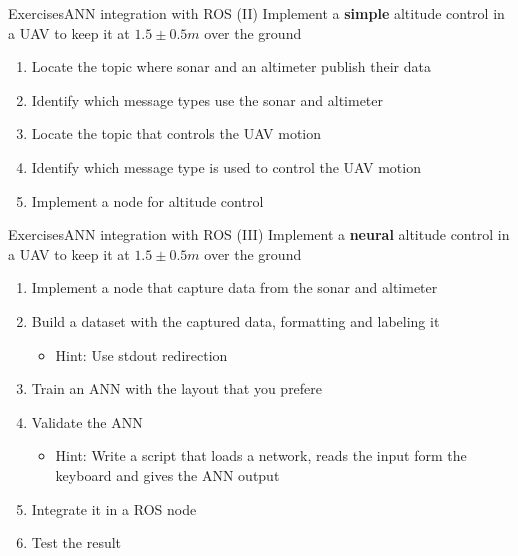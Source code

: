 \documentclass[10pt,compress]{beamer} %
\begin{document}
\begin{frame}{Exercises}{ANN integration with ROS (II)}
	Implement a \textbf{simple} altitude control in a UAV to keep it at $1.5\pm0.5 m$ over the ground
	\begin{enumerate}
		\item Locate the topic where sonar and an altimeter publish their data
		\item Identify which message types use the sonar and altimeter
		\item Locate the topic that controls the UAV motion
		\item Identify which message type is used to control the UAV motion
		\item Implement a node for altitude control
	\end{enumerate}
\end{frame}

\begin{frame}{Exercises}{ANN integration with ROS (III)}
	Implement a \textbf{neural} altitude control in a UAV to keep it at $1.5\pm0.5 m$ over the ground
	\begin{enumerate}
		\item Implement a node that capture data from the sonar and altimeter
		\item Build a dataset with the captured data, formatting and labeling it
			\begin{itemize}
			\item Hint: Use stdout redirection
			\end{itemize}
		\item Train an ANN with the layout that you prefere
		\item Validate the ANN
			\begin{itemize}
			\item Hint: Write a script that loads a network, reads the input form the keyboard and gives the ANN output
			\end{itemize}
		\item Integrate it in a ROS node
		\item Test the result
	\end{enumerate}
\end{frame}
\end{document}
